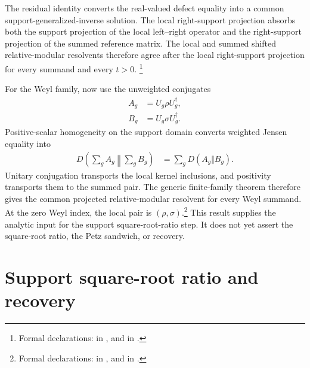 \documentclass[11pt]{article}
\begin{document}
The residual identity converts the real-valued defect equality into a common
support-generalized-inverse solution. The local right-support projection
absorbs both the support projection of the local left--right operator and the
right-support projection of the summed reference matrix. The local and summed
shifted relative-modular resolvents therefore agree after the local
right-support projection for every summand and every $t>0$.%
\footnote{Formal declarations:
 in
, and
in .}

For the Weyl family, now use the unweighted conjugates
\begin{align}
    A_g
        &=U_g\rho U_g^\dagger,
    \label{eq:cpsv16_ssa_equality_hayashi_markov_unweighted_weyl_state}\\
    B_g
        &=U_g\sigma U_g^\dagger.
    \label{eq:cpsv16_ssa_equality_hayashi_markov_unweighted_weyl_reference}
\end{align}
Positive-scalar homogeneity on the support domain converts weighted Jensen
equality into
\begin{align}
    D\!\left(\sum_gA_g\middle\Vert\sum_gB_g\right)
        &=\sum_gD(A_g\Vert B_g).
    \label{eq:cpsv16_ssa_equality_hayashi_markov_unweighted_weyl_gap_zero}
\end{align}
Unitary conjugation transports the local kernel inclusions, and positivity
transports them to the summed pair. The generic finite-family theorem therefore
gives the common projected relative-modular resolvent for every Weyl summand.
At the zero Weyl index, the local pair is $(\rho,\sigma)$.\footnote{Formal
declarations:
 in
, and
in
.}
This result supplies the analytic input for the support square-root-ratio step.
It does not yet assert the square-root ratio, the Petz sandwich, or recovery.

\section{Support square-root ratio and recovery}
\end{document}
